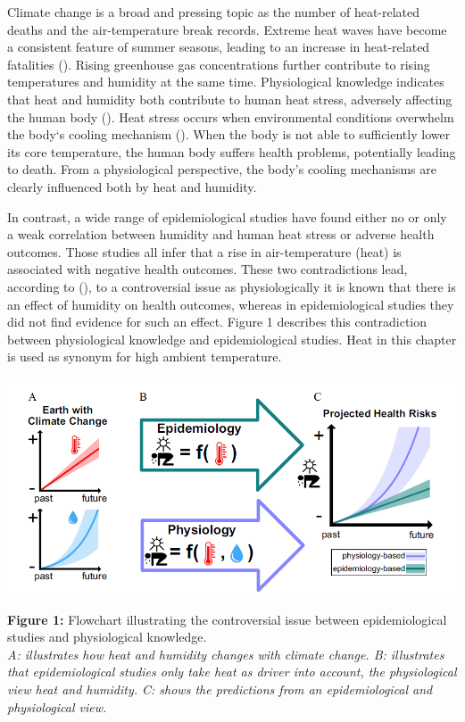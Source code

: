 \documentclass[
]{krantz}
\begin{document}
Climate change is a broad and pressing topic as the number of heat-related deaths and the air-temperature break records. Extreme heat waves have become a consistent feature of summer seasons, leading to an increase in heat-related fatalities (\citet{ebi}). Rising greenhouse gas concentrations further contribute to rising temperatures and humidity at the same time. Physiological knowledge indicates that heat and humidity both contribute to human heat stress, adversely affecting the human body (\citet{bald}). Heat stress occurs when environmental conditions overwhelm the body`s cooling mechanism (\citet{buzan}). When the body is not able to sufficiently lower its core temperature, the human body suffers health problems, potentially leading to death. From a physiological perspective, the body's cooling mechanisms are clearly influenced both by heat and humidity.

In contrast, a wide range of epidemiological studies have found either no or only a weak correlation between humidity and human heat stress or adverse health outcomes. Those studies all infer that a rise in air-temperature (heat) is associated with negative health outcomes. These two contradictions lead, according to (\citet{bald}), to a controversial issue as physiologically it is known that there is an effect of humidity on health outcomes, whereas in epidemiological studies they did not find evidence for such an effect. Figure 1 describes this contradiction between physiological knowledge and epidemiological studies. Heat in this chapter is used as synonym for high ambient temperature.

\begin{center}\includegraphics[width=0.8\linewidth]{Controversial Issue} \end{center}

\textbf{Figure 1:} Flowchart illustrating the controversial issue between epidemiological studies and physiological knowledge.\\
\emph{A: illustrates how heat and humidity changes with climate change. B: illustrates that epidemiological studies only take heat as driver into account, the physiological view heat and humidity. C: shows the predictions from an epidemiological and physiological view.}
\end{document}
